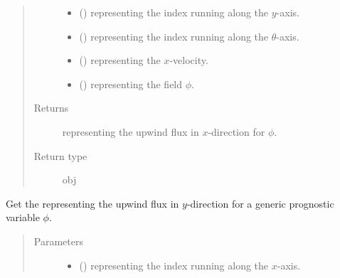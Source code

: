 \documentclass[letterpaper,10pt,english]{sphinxmanual}
\begin{document}
\begin{fulllineitems}
\begin{fulllineitems}
\begin{quote}
\begin{description}
\begin{itemize}
\item {} 
 () \textendash{}  representing the index running along the \(y\)-axis.

\item {} 
 () \textendash{}  representing the index running along the \(\theta\)-axis.

\item {} 
 () \textendash{}  representing the \(x\)-velocity.

\item {} 
 () \textendash{}  representing the field \(\phi\).

\end{itemize}

\item[{Returns}] \leavevmode
{} representing the upwind flux in \(x\)-direction for \(\phi\).

\item[{Return type}] \leavevmode
obj

\end{description}\end{quote}

\end{fulllineitems}


\begin{fulllineitems}
\label{\detokenize{api:tasmania.dycore.flux_isentropic_upwind.FluxIsentropicUpwind._get_upwind_flux_y}}
Get the  representing the upwind flux in \(y\)-direction
for a generic prognostic variable \(\phi\).
\begin{quote}\begin{description}
\item[{Parameters}] \leavevmode\begin{itemize}
\item {} 
 () \textendash{}  representing the index running along the \(x\)-axis.


\end{itemize}
\end{description}
\end{quote}
\end{fulllineitems}
\end{fulllineitems}
\end{document}

